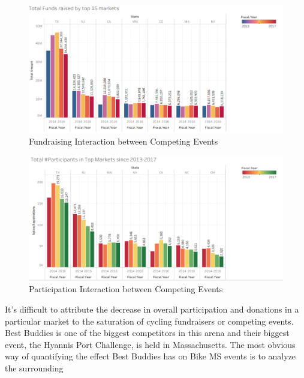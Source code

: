 \documentclass[]{article}
\begin{document}
\begin{figure}
\centering
\includegraphics{fundsraisedbytopmarkets.png}
\caption{Fundraising Interaction between Competing Events}
\end{figure}

\begin{figure}
\centering
\includegraphics{participantsfromtopmarkets.png}
\caption{Participation Interaction between Competing Events}
\end{figure}

It's difficult to attribute the decrease in overall participation and
donations in a particular market to the saturation of cycling
fundraisers or competing events. Best Buddies is one of the biggest
competitors in this arena and their biggest event, the Hyannis Port
Challenge, is held in Massachusetts. The most obvious way of quantifying
the effect Best Buddies has on Bike MS events is to analyze the
surrounding
\end{document}
